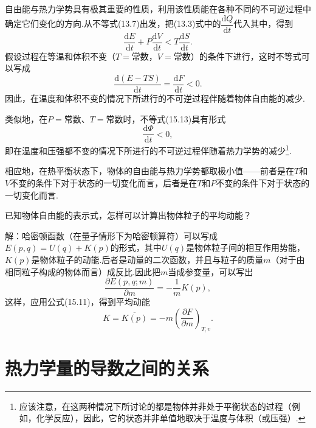 自由能与热力学势具有极其重要的性质，利用该性质能在各种不同的不可逆过程中确定它们变化的方向.从不等式(13.7)出发，把(13.3)式中的$\dfrac{\mathrm{d}Q}{\mathrm{d}t}$代入其中，得到
\begin{equation}
  \frac{\mathrm{d}E}{\mathrm{d}t}
  +P\frac{\mathrm{d}V}{\mathrm{d}t}
  <T\frac{\mathrm{d}S}{\mathrm{d}t}.
\end{equation}
假设过程在等温和体积不变（$T=$常数，$V=$常数）的条件下进行，这时不等式可以写成
\begin{equation}
  \frac{\mathrm{d}(E-TS)}{\mathrm{d}t}
  =\frac{\mathrm{d}F}{\mathrm{d}t}<0.
\end{equation}
因此，在温度和体积不变的情况下所进行的不可逆过程伴随着物体自由能的减少.

类似地，在$P=$常数、$T=$常数时，不等式(15.13)具有形式
\begin{equation}
  \frac{\mathrm{d}\varPhi}{\mathrm{d}t}<0,
\end{equation}
即在温度和压强都不变的情况下所进行的不可逆过程伴随着热力学势的减少\footnote{应该注意，在这两种情况下所讨论的都是物体并非处于平衡状态的过程（例如，化学反应），因此，它的状态并非单值地取决于温度与体积（或压强）.}.

相应地，在热平衡状态下，物体的自由能与热力学势都取极小值——前者是在$T$和$V$不变的条件下对于状态的一切变化而言，后者是在$T$和$P$不变的条件下对于状态的一切变化而言.

\begin{xiti}

已知物体自由能的表示式，怎样可以计算出物体粒子的平均动能？

解：哈密顿函数（在量子情形下为哈密顿算符）可以写成$E(p,q)=U(q)+K(p)$的形式，其中$U(q)$是物体粒子间的相互作用势能，$K(p)$是物体粒子的动能.后者是动量的二次函数，并且与粒子的质量$m$（对于由相同粒子构成的物体而言）成反比.因此把$m$当成参变量，可以写出
\begin{equation*}
  \frac{\partial E(p,q;m)}{\partial m}
  =-\frac{1}{m}K(p),
\end{equation*}
这样，应用公式(15.11)，得到平均动能
\begin{equation*}
  K=\overline{K(p)}
  =-m\left(\frac{\partial F}{\partial m}\right)_{T,v}.
\end{equation*}

\end{xiti}

\section{热力学量的导数之间的关系}

